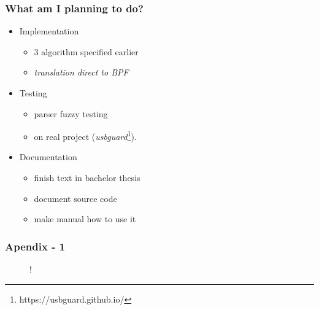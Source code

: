 \documentclass[10pt,xcolor=pdflatex,notes]{beamer}
\begin{document}
\begin{frame}\frametitle{What am I planning to do?}
	\begin{itemize}
		\item{Implementation}
		\begin{itemize}
			\item 3 algorithm specified earlier
			\item \textit{translation direct to BPF}
		\end{itemize}
		\item{Testing}
		\begin{itemize}
			\item parser fuzzy testing\cite{fuzzy}
			\item on real project (\textit{usbguard}\footnote{https://usbguard.github.io/}).
		\end{itemize}
		\item{Documentation}
		\begin{itemize}
			\item finish text in bachelor thesis
			\item document source code
			\item make manual how to use it
		\end{itemize}
	\end{itemize}
\end{frame}


\begin{frame}\frametitle{Apendix - 1}
	\begin{figure}[h]
		\centering
		\resizebox {\textwidth} {!} {
			
		}
		\label{fig:tikz:architecture2}
	\end{figure}
\end{frame}
\end{document}
